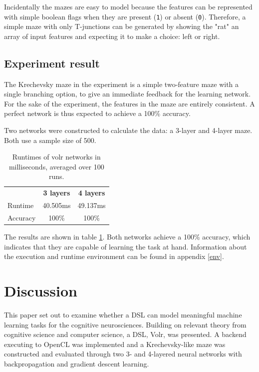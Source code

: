 \documentclass[a4paper,oneside]{memoir}
\begin{document}
Incidentally the mazes are easy to model because the features can be represented
with simple boolean flags when they are present (\texttt{1}) or absent (\texttt{0}).
Therefore, a simple maze with only T-junctions can be generated by showing the "rat"
an array of input features and expecting it to make a choice: left or right.

\section{Experiment result}
The Krechevsky maze in the experiment is a simple two-feature maze with
a single branching option, to give an immediate feedback for the learning
network. For the sake of the experiment, the features in the maze are entirely
consistent. A perfect network is thus expected to achieve a 100\% accuracy.

Two networks were constructed to calculate the data: a 3-layer and 4-layer
maze. Both use a sample size of 500.

\begin{table}
  \centering
  \begin{tabular}{l c c}
    & \textbf{3 layers} & \textbf{4 layers} \\
    Runtime & 40.505ms & 49.137ms \\
    Accuracy & 100\% & 100\%
  \end{tabular}

  \caption{Runtimes of volr networks in milliseconds, averaged over 100 runs.}
  \label{case:runtimes}
\end{table}

The results are shown in table \ref{case:runtimes}. Both networks achieve
a 100\% accuracy, which indicates that they are capable of learning the task
at hand.
Information about the execution and runtime environment can be found in
appendix \ref{env}.

\chapter{Discussion}
This paper set out to examine whether a DSL can model meaningful machine
learning tasks for the cognitive neurosciences. Building on
relevant theory from cognitive science and computer science, a DSL, Volr,
was presented. A backend executing to OpenCL was implemented and a
Krechevsky-like maze was constructed and evaluated through two 3- and
4-layered neural networks with backpropagation and gradient descent learning.
\end{document}
